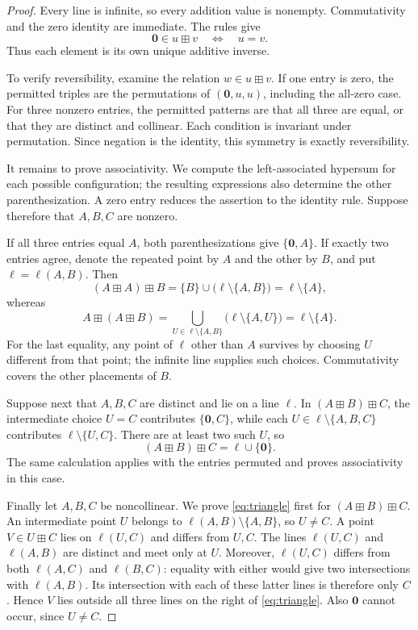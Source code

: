 \documentclass[11pt]{article}
\theoremstyle{remark}
\newcommand{\hz}{\mathbf 0}
\newcommand{\hs}{\boxplus}
\begin{document}
\begin{proof}
Every line is infinite, so every addition value is nonempty.
Commutativity and the zero identity are immediate. The rules give
\begin{equation}\label{eq:self-inverse}
 \hz\in u\hs v\quad\Longleftrightarrow\quad u=v.
\end{equation}
Thus each element is its own unique additive inverse.

To verify reversibility, examine the relation $w\in u\hs v$.
If one entry is zero, the permitted triples are the permutations of
$(\hz,u,u)$, including the all-zero case. For three nonzero entries,
the permitted patterns are that all three are equal, or that they are
distinct and collinear. Each condition is invariant under permutation.
Since negation is the identity, this symmetry is exactly reversibility.

It remains to prove associativity. We compute the left-associated
hypersum for each possible configuration; the resulting expressions
also determine the other parenthesization.
A zero entry reduces the assertion to the identity rule. Suppose
therefore that $A,B,C$ are nonzero.

If all three entries equal $A$, both parenthesizations give
$\{\hz,A\}$. If exactly two entries agree, denote the repeated point
by $A$ and the other by $B$, and put $\ell=\ell(A,B)$. Then
\[
 (A\hs A)\hs B
 =\{B\}\cup\bigl(\ell\setminus\{A,B\}\bigr)
 =\ell\setminus\{A\},
\]
whereas
\[
 A\hs(A\hs B)
 =\bigcup_{U\in\ell\setminus\{A,B\}}
       \bigl(\ell\setminus\{A,U\}\bigr)
 =\ell\setminus\{A\}.
\]
For the last equality, any point of $\ell$ other than $A$ survives by
choosing $U$ different from that point; the infinite line supplies such
choices. Commutativity covers the other placements of $B$.

Suppose next that $A,B,C$ are distinct and lie on a line $\ell$.
In $(A\hs B)\hs C$, the intermediate choice $U=C$ contributes
$\{\hz,C\}$, while each $U\in\ell\setminus\{A,B,C\}$ contributes
$\ell\setminus\{U,C\}$. There are at least two such $U$, so
\[
 (A\hs B)\hs C=\ell\cup\{\hz\}.
\]
The same calculation applies with the entries permuted and proves
associativity in this case.

Finally let $A,B,C$ be noncollinear. We prove
\eqref{eq:triangle} first for $(A\hs B)\hs C$.
An intermediate point $U$ belongs to
$\ell(A,B)\setminus\{A,B\}$, so $U\ne C$. A point
$V\in U\hs C$ lies on $\ell(U,C)$ and differs from $U,C$.
The lines $\ell(U,C)$ and $\ell(A,B)$ are distinct and meet only at
$U$. Moreover, $\ell(U,C)$ differs from both $\ell(A,C)$ and
$\ell(B,C)$: equality with either would give two intersections with
$\ell(A,B)$. Its intersection with each of these latter lines is
therefore only $C$. Hence $V$ lies outside all three lines on the
right of \eqref{eq:triangle}. Also $\hz$ cannot occur, since $U\ne C$.


\end{proof}
\end{document}
